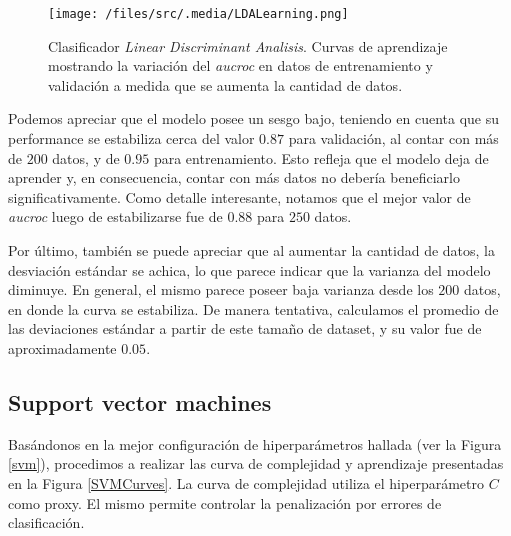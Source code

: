\vspace{0.5em}
\begin{figure}[!htbp]
    \centering
    \texttt{[image: /files/src/.media/LDALearning.png]}
    \caption{Clasificador \textit{Linear Discriminant Analisis}. Curvas de aprendizaje mostrando la variación del \textit{aucroc} en datos de entrenamiento y validación a medida que se aumenta la cantidad de datos\protect\footnotemark.}
    \label{LDALearning}
\end{figure}

Podemos apreciar que el modelo posee un sesgo bajo, teniendo en cuenta que su performance se estabiliza cerca del valor $0.87$ para validación, al contar con más de $200$ datos, y de $0.95$ para entrenamiento. Esto refleja que el modelo deja de aprender y, en consecuencia, contar con más datos no debería beneficiarlo significativamente. Como detalle interesante, notamos que el mejor valor de \textit{aucroc} luego de estabilizarse fue de $0.88$ para $250$ datos.

Por último, también se puede apreciar que al aumentar la cantidad de datos, la desviación estándar se achica, lo que parece indicar que la varianza del modelo diminuye. En general, el mismo parece poseer baja varianza desde los $200$ datos, en donde la curva se estabiliza. De manera tentativa, calculamos el promedio de las deviaciones estándar a partir de este tamaño de dataset, y su valor fue de aproximadamente $0.05$.


\subsection{Support vector machines}
Basándonos en la mejor configuración de hiperparámetros hallada (ver la Figura \ref{svm}), procedimos a realizar las curva de complejidad y aprendizaje presentadas en la Figura \ref{SVMCurves}.  La curva de complejidad utiliza el hiperparámetro $C$ como proxy. El mismo permite controlar la penalización por errores de clasificación. %

